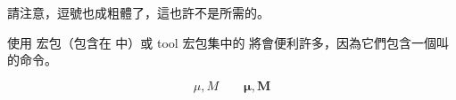 %

\noindent 請注意，逗號也成粗體了，這也許不是所需的。

使用  宏包（包含在  中）或 tool 宏包集中的  將會便利許多，因為它們包含一個叫  的命令。

\ifx\boldsymbol\undefined\else
\begin{example}
\begin{displaymath}
\mu, M \qquad
\boldsymbol{\mu}, \boldsymbol{M}
\end{displaymath}
\end{example}
\fi


%


